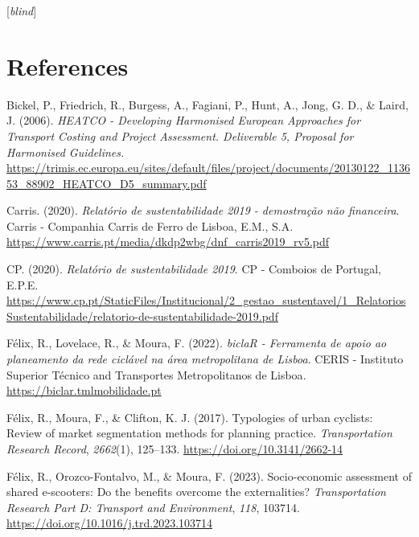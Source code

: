 \documentclass[review, doubleblind, 3p,
authoryear]{elsarticle} %
\newlength{\cslhangindent}
\newlength{\cslentryspacingunit} %
\newenvironment{CSLReferences}[2] %
 {%
  \setlength{\parindent}{0pt}
  \ifodd #1
  \let\oldpar\par
  \def\par{\hangindent=\cslhangindent\oldpar}
  \fi
  \setlength{\parskip}{#2\cslentryspacingunit}
 }%
 {}
\begin{document}
{[}\emph{blind}{]}

\hypertarget{references}{%
\section*{References}\label{references}}

\hypertarget{refs}{}
\begin{CSLReferences}{1}{0}
\leavevmode{}%
Bickel, P., Friedrich, R., Burgess, A., Fagiani, P., Hunt, A., Jong, G.
D., \& Laird, J. (2006). \emph{{HEATCO - Developing Harmonised European
Approaches for Transport Costing and Project Assessment. Deliverable 5,
Proposal for Harmonised Guidelines.}}
\url{https://trimis.ec.europa.eu/sites/default/files/project/documents/20130122_113653_88902_HEATCO_D5_summary.pdf}

\leavevmode{}%
Carris. (2020). \emph{Relatório de sustentabilidade 2019 - demostração
não financeira}. {Carris - Companhia Carris de Ferro de Lisboa, E.M.,
S.A.} \url{https://www.carris.pt/media/dkdp2wbg/dnf_carris2019_rv5.pdf}

\leavevmode{}%
CP. (2020). \emph{Relatório de sustentabilidade 2019}. {CP - Comboios de
Portugal, E.P.E.}
\url{https://www.cp.pt/StaticFiles/Institucional/2_gestao_sustentavel/1_RelatoriosSustentabilidade/relatorio-de-sustentabilidade-2019.pdf}

\leavevmode{}%
Félix, R., Lovelace, R., \& Moura, F. (2022). \emph{{biclaR - Ferramenta
de apoio ao planeamento da rede ciclável na área metropolitana de
Lisboa}}. {CERIS - Instituto Superior Técnico and Transportes
Metropolitanos de Lisboa}. \url{https://biclar.tmlmobilidade.pt}

\leavevmode{}%
Félix, R., Moura, F., \& Clifton, K. J. (2017). Typologies of urban
cyclists: Review of market segmentation methods for planning practice.
\emph{Transportation Research Record}, \emph{2662}(1), 125--133.
\url{https://doi.org/10.3141/2662-14}

\leavevmode{}%
Félix, R., Orozco-Fontalvo, M., \& Moura, F. (2023). Socio-economic
assessment of shared e-scooters: Do the benefits overcome the
externalities? \emph{Transportation Research Part D: Transport and
Environment}, \emph{118}, 103714.
\url{https://doi.org/10.1016/j.trd.2023.103714}


\end{CSLReferences}
\end{document}
